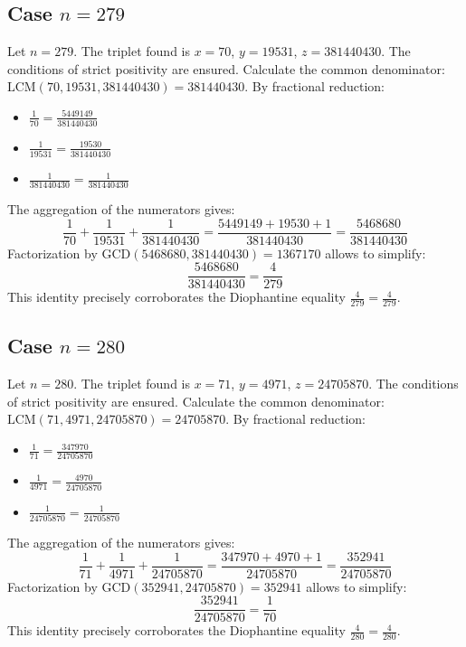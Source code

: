 \documentclass[11pt,a4paper]{article}
\begin{document}
\subsection{Case $n = 279$}
Let $n = 279$. The triplet found is $x = 70$, $y = 19531$, $z = 381440430$.
The conditions of strict positivity are ensured.
Calculate the common denominator: $\text{LCM}(70, 19531, 381440430) = 381440430$.
By fractional reduction:
\begin{itemize}
    \item $\frac{1}{70} = \frac{5449149}{381440430}$
    \item $\frac{1}{19531} = \frac{19530}{381440430}$
    \item $\frac{1}{381440430} = \frac{1}{381440430}$
\end{itemize}
The aggregation of the numerators gives:
$$ \frac{1}{70} + \frac{1}{19531} + \frac{1}{381440430} = \frac{5449149 + 19530 + 1}{381440430} = \frac{5468680}{381440430} $$
Factorization by $\text{GCD}(5468680, 381440430) = 1367170$ allows to simplify:
$$ \frac{5468680}{381440430} = \frac{4}{279} $$
This identity precisely corroborates the Diophantine equality $\frac{4}{279} = \frac{4}{279}$.

\subsection{Case $n = 280$}
Let $n = 280$. The triplet found is $x = 71$, $y = 4971$, $z = 24705870$.
The conditions of strict positivity are ensured.
Calculate the common denominator: $\text{LCM}(71, 4971, 24705870) = 24705870$.
By fractional reduction:
\begin{itemize}
    \item $\frac{1}{71} = \frac{347970}{24705870}$
    \item $\frac{1}{4971} = \frac{4970}{24705870}$
    \item $\frac{1}{24705870} = \frac{1}{24705870}$
\end{itemize}
The aggregation of the numerators gives:
$$ \frac{1}{71} + \frac{1}{4971} + \frac{1}{24705870} = \frac{347970 + 4970 + 1}{24705870} = \frac{352941}{24705870} $$
Factorization by $\text{GCD}(352941, 24705870) = 352941$ allows to simplify:
$$ \frac{352941}{24705870} = \frac{1}{70} $$
This identity precisely corroborates the Diophantine equality $\frac{4}{280} = \frac{4}{280}$.
\end{document}
